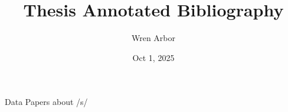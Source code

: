 \documentclass[11pt]{article}
\title{Thesis Annotated Bibliography}
\author{Wren Arbor}
\date{Oct 1, 2025}
\begin{document}
\maketitle
Data Papers about /s/
\end{document}
